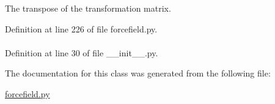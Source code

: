 \-The transpose of the transformation matrix. 



\-Definition at line 226 of file forcefield.\-py.

\hypertarget{classforcebalance_1_1BaseClass_afd68efa29ccd2f320f4cf82198214aac}{
\paragraph[{verbose\-\_\-options}]{}}\label{classforcebalance_1_1BaseClass_afd68efa29ccd2f320f4cf82198214aac}


\-Definition at line 30 of file \-\_\-\-\_\-init\-\_\-\-\_\-.\-py.



\-The documentation for this class was generated from the following file\-:\begin{DoxyCompactItemize}
\item 
\hyperlink{forcefield_8py}{forcefield.\-py}\end{DoxyCompactItemize}
